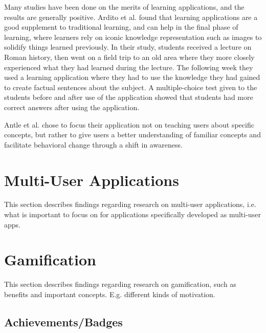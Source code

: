 Many studies have been done on the merits of learning applications, and the results are generally positive. Ardito et al.\citep{Ardito} found that learning applications are a good supplement to traditional learning, and can help in the final phase of learning, where learners rely on iconic knowledge representation such as images to solidify things learned previously. In their study, students received a lecture on Roman history, then went on a field trip to an old area where they more closely experienced what they had learned during the lecture. The following week they used a learning application where they had to use the knowledge they had gained to create factual sentences about the subject. A multiple-choice test given to the students before and after use of the application showed that students had more correct answers after using the application.

Antle et al.\citep{AntleFutura} chose to focus their application not on teaching users about specific concepts, but rather to give users a better understanding of familiar concepts and facilitate behavioral change through a shift in awareness.


\section{Multi-User Applications}

This section describes findings regarding research on multi-user applications, i.e. what is important to focus on for applications specifically developed as multi-user apps.


\section{Gamification}

This section describes findings regarding research on gamification, such as benefits and important concepts. E.g. different kinds of motivation.

\subsection{Achievements/Badges}


